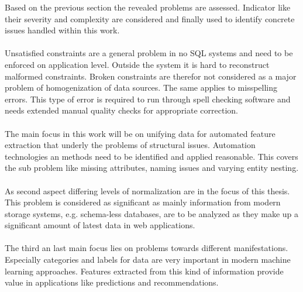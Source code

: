 Based on the previous section the revealed problems are assessed. Indicator like their severity and complexity are considered and finally used to identify concrete issues handled within this work. 
\\\\
Unsatisfied constraints are a general problem in no SQL systems and need to be enforced on application level. Outside the system it is hard to reconstruct malformed constraints. Broken constraints are therefor not considered as a major problem of homogenization of data sources. The same applies to misspelling errors. This type of error is required to run through spell checking software and needs extended manual quality checks for appropriate correction. 
\\\\
The main focus in this work will be on unifying data for automated feature extraction that underly the problems of structural issues. Automation technologies an methods need to be identified and applied reasonable. This covers the sub problem like missing attributes, naming issues and varying entity nesting.
\\\\
As second aspect differing levels of normalization are in the focus of this thesis. This problem is considered as significant as mainly information from modern storage systems, e.g. schema-less databases, are to be analyzed as they make up a significant amount of latest data in web applications.
\\\\
The third an last main focus lies on problems towards different manifestations. Especially categories and labels for data are very important in modern machine learning approaches. Features extracted from this kind of information provide value in applications like predictions and recommendations.
